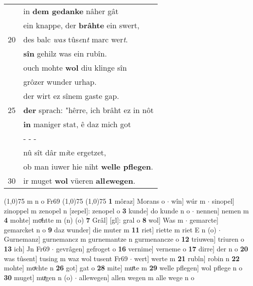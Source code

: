 \documentclass[8pt,a4paper,notitlepage]{article}
\begin{document}
\begin{table}[ht]
\begin{minipage}[t]{0.5\linewidth}
\begin{tabular}{rl}
 & in \textbf{dem gedanke} nâher gât\\ 
 & ein knappe, der \textbf{brâhte} ein swert,\\ 
20 & des balc \textit{was} tûs\textit{e}n\textit{t} marc wer\textit{t}.\\ 
 & \textbf{sîn} gehilz was ein rubîn.\\ 
 & ouch mohte \textbf{wol} diu klinge sîn\\ 
 & grôzer wunder urhap.\\ 
 & der wirt ez sînem gaste gap.\\ 
25 & \textbf{der} sprach: "hêrre, ich brâht ez in nôt\\ 
 & \textbf{in} maniger stat, ê daz mich got\\ 
 & \multicolumn{1}{l}{ - - - }\\ 
 & nû sît dâr m\textit{i}te ergetzet,\\ 
 & ob man iuwer hie niht \textbf{welle pflegen}.\\ 
30 & ir muget  \textbf{wol} vüeren \textbf{all\textit{e}wegen}.\\ 
\end{tabular}
\scriptsize
\line(1,0){75} \newline
m n o Fr69 \newline
\line(1,0){75} \newline
\newline
\line(1,0){75} \newline
\textbf{1} môraz] Morans o  $\cdot$ wîn] wúr m  $\cdot$ sinopel] zinoppel m zenopel n [zepel]: zenopel o \textbf{3} kunde] do kunde n o  $\cdot$ nennen] nemen m \textbf{4} mohte] moͯhtte m (n) (o) \textbf{7} Grâl] [gl]: gral o \textbf{8} wol] Was m  $\cdot$ gemarcte] gemarcket n o \textbf{9} daz wunder] die muter m \textbf{11} riet] riette m riet E n (o)  $\cdot$ Gurnemanz] gurnemancz m gurnemantze n gurmenancze o \textbf{12} triuwen] triuren o \textbf{13} ich] Jn Fr69  $\cdot$ gevrâgen] gefroget o \textbf{16} vernime] verneme o \textbf{17} dirre] der n o \textbf{20} was tûsent] tusing m waz wol tusent Fr69  $\cdot$ wert] werte m \textbf{21} rubîn] robin n \textbf{22} mohte] moͯchte n \textbf{26} got] gat o \textbf{28} mite] muͦte m \textbf{29} welle pflegen] wol pflege n o \textbf{30} muget] muͯgen n (o)  $\cdot$ allewegen] allen wegen m alle wege n o \newline
\end{minipage}
\end{table}
\newpage
\end{document}
